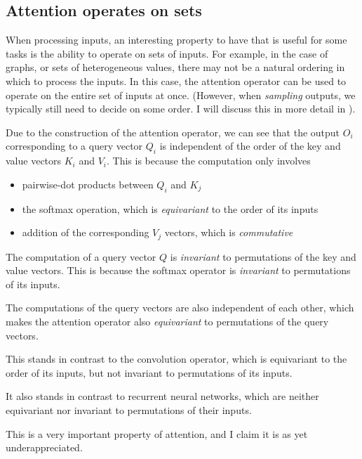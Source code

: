 \subsection{Attention operates on sets}

When processing inputs, an interesting property to have that is useful for some tasks is the ability to operate on sets of inputs. For example, in the case of graphs, or sets of heterogeneous values, there may not be a natural ordering in which to process the inputs. In this case, the attention operator can be used to operate on the entire set of inputs at once. (However, when \textit{sampling} outputs, we typically still need to decide on some order. I will discuss this in more detail in ).

Due to the construction of the attention operator, we can see that the output $O_i$ corresponding to a query vector $Q_i$ is independent of the order of the key and value vectors $K_i$ and $V_i$. This is because the computation only involves
\begin{itemize}
    \item pairwise-dot products between $Q_i$ and $K_j$
    \item the softmax operation, which is \textit{equivariant} to the order of its inputs
    \item addition of the corresponding $V_j$ vectors, which is \textit{commutative}
\end{itemize}

The computation of a query vector $Q$ is \textit{invariant} to permutations of the key and value vectors. This is because the softmax operator is \textit{invariant} to permutations of its inputs.

The computations of the query vectors are also independent of each other, which makes the attention operator also \textit{equivariant} to permutations of the query vectors.

This stands in contrast to the convolution operator, which is equivariant to the order of its inputs, but not invariant to permutations of its inputs.

It also stands in contrast to recurrent neural networks, which are neither equivariant nor invariant to permutations of their inputs.

This is a very important property of attention, and I claim it is as yet underappreciated.


